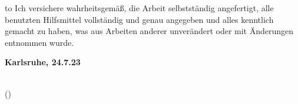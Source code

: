 
\thispagestyle{empty}
\null\vfill
\noindent\hbox to \textwidth{\hrulefill} 
%
{Ich versichere wahrheitsgemäß, die Arbeit
selbstständig angefertigt, alle benutzten Hilfsmittel vollständig und genau
angegeben und alles kenntlich gemacht zu haben, was aus Arbeiten anderer
unverändert oder mit Änderungen entnommen wurde.}
 
 
\textbf{Karlsruhe, 24.7.23}
\vspace{1.5cm}
 
\dotfill\hspace*{8.0cm}\\
\hspace*{2cm}(\theauthor) 
\cleardoublepage